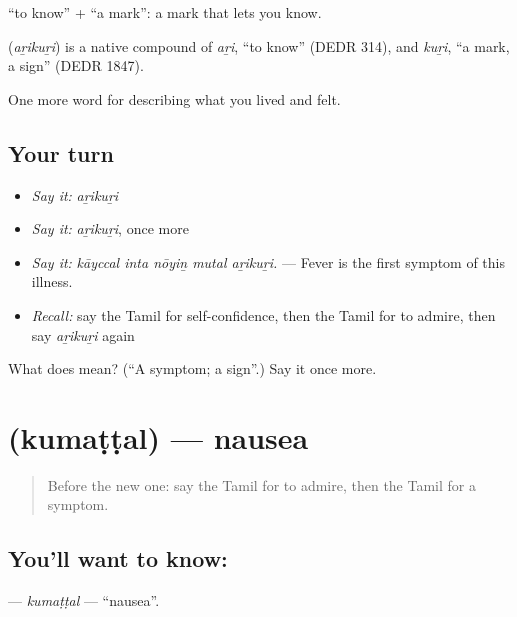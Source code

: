  \textquotedblleft{}to know\textquotedblright{} +  \textquotedblleft{}a mark\textquotedblright{}: a mark that lets you know.

\begin{cousinweb}
\textbf{} (\emph{aṟikuṟi}) is a native compound of  \emph{aṟi}, \textquotedblleft{}to know\textquotedblright{} (DEDR 314), and  \emph{kuṟi}, \textquotedblleft{}a mark, a sign\textquotedblright{} (DEDR 1847).
\end{cousinweb}

\begin{grammarlens}[title={What you've built}]
One more word for describing what you lived and felt.
\end{grammarlens}

\subsection*{Your turn}
\begin{itemize}
\raggedright
  \item \emph{Say it:} \emph{aṟikuṟi}
  \item \emph{Say it:} \emph{aṟikuṟi}, once more
  \item \emph{Say it:} \emph{kāyccal inta nōyiṉ mutal aṟikuṟi.} — Fever is the first symptom of this illness.
  \item \emph{Recall:} say the Tamil for self-confidence, then the Tamil for to admire, then say \emph{aṟikuṟi} again
\end{itemize}

\begin{tcolorbox}[breakable,colback=teal!4,colframe=teal!35!black,title={Before you move on}]
What does  mean? (\textquotedblleft{}A symptom; a sign\textquotedblright{}.) Say it once more.
\end{tcolorbox}
\section[\texorpdfstring{\ta{குமட்டல்} (kumaṭṭal)}{குமட்டல் (kumaṭṭal)}]{ (kumaṭṭal) — nausea}

\label{lesson:TA-C474-kumattal}



\begin{quote}
Before the new one: say the Tamil for to admire, then the Tamil for a symptom.
\end{quote}

\subsection*{You'll want to know: }
\textbf{} — \emph{kumaṭṭal} — \textquotedblleft{}nausea\textquotedblright{}.

